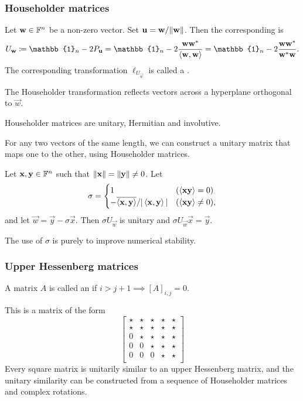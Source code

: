 \subsubsection{Householder matrices}
\begin{definition}
Let $\boldsymbol{\mathrm{w}}\in\mathbb{F}^n$ be a non-zero vector. Set $\boldsymbol{\mathrm{u}} = \boldsymbol{\mathrm{w}}/\lVert\boldsymbol{\mathrm{w}}\rVert$. Then the corresponding  is
\[ U_{\vec{w}} \defeq \mathbb{1}_n - 2P_{\vec{u}} = \mathbb{1}_n - 2 \frac{\vec{w}\vec{w}^*}{\inner{\vec{w},\vec{w}}} = \mathbb{1}_n - 2 \frac{\vec{w}\vec{w}^*}{\vec{w}^*\vec{w}}. \]
The corresponding transformation $\ell_{U_{\vec{w}}}$ is called a .
\end{definition}
The Householder transformation reflects vectors across a hyperplane orthogonal to $\vec{w}$.

\begin{lemma}
Householder matrices are unitary, Hermitian and involutive.
\end{lemma}

For any two vectors of the same length, we can construct a unitary matrix that maps one to the other, using Householder matrices.

\begin{proposition}
Let $\boldsymbol{\mathrm{x}},\boldsymbol{\mathrm{y}}\in\mathbb{F}^n$ such that $\lVert\boldsymbol{\mathrm{x}}\rVert = \lVert\boldsymbol{\mathrm{y}}\rVert \neq 0$. Let
\[ \sigma = \begin{cases}
1& (\left\langle \boldsymbol{\mathrm{x}}\boldsymbol{\mathrm{y}} \right\rangle = 0) \\ -\overline{\left\langle \boldsymbol{\mathrm{x}},\boldsymbol{\mathrm{y}} \right\rangle}/|\left\langle \boldsymbol{\mathrm{x}},\boldsymbol{\mathrm{y}} \right\rangle| & (\left\langle \boldsymbol{\mathrm{x}}\boldsymbol{\mathrm{y}} \right\rangle \neq 0),
\end{cases} \]
and let $\vec{w} = \vec{y}-\sigma \vec{x}$. Then $\sigma U_{\vec{w}}$ is unitary and $\sigma U_{\vec{w}}\vec{x} = \vec{y}$.
\end{proposition}
The use of $\sigma$ is purely to improve numerical stability.

\subsubsection{Upper Hessenberg matrices}
\begin{definition}
A matrix $A$ is called an  if $i>j+1\implies [A]_{i,j}=0$.
\end{definition}
This is a matrix of the form
\[ \begin{bmatrix}
\star & \star & \star & \star & \star \\
\star & \star & \star & \star & \star \\
0 & \star & \star & \star & \star \\
0 & 0 & \star & \star & \star \\
0 & 0 & 0 & \star & \star \\
\end{bmatrix} \]
Every square matrix is unitarily similar to an upper Hessenberg matrix, and the unitary
similarity can be constructed from a sequence of Householder matrices and complex rotations.

